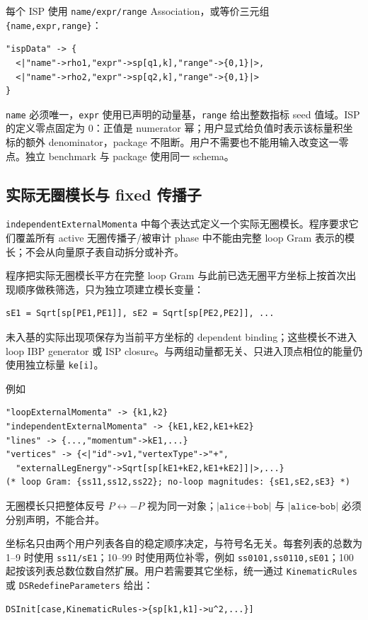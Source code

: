 ﻿\documentclass[a4paper,11pt]{article}
\begin{document}
每个 ISP 使用 \texttt{name/expr/range} Association，或等价三元组 \texttt{\{name,expr,range\}}：
\begin{verbatim}
"ispData" -> {
  <|"name"->rho1,"expr"->sp[q1,k],"range"->{0,1}|>,
  <|"name"->rho2,"expr"->sp[q2,k],"range"->{0,1}|>
}
\end{verbatim}
\texttt{name} 必须唯一，\texttt{expr} 使用已声明的动量基，\texttt{range} 给出整数指标 seed 值域。ISP 的定义零点固定为 $0$：正值是 numerator 幂；用户显式给负值时表示该标量积坐标的额外 denominator，package 不阻断。用户不需要也不能用输入改变这一零点。独立 benchmark 与 package 使用同一 schema。

\subsection{实际无圈模长与 fixed 传播子}

\texttt{independentExternal\allowbreak Momenta} 中每个表达式定义一个实际无圈模长。程序要求它们覆盖所有 active 无圈传播子/被审计 phase 中不能由完整 loop Gram 表示的模长；不会从向量原子表自动拆分或补齐。

程序把实际无圈模长平方在完整 loop Gram 与此前已选无圈平方坐标上按首次出现顺序做秩筛选，只为独立项建立模长变量：
\begin{verbatim}
sE1 = Sqrt[sp[PE1,PE1]], sE2 = Sqrt[sp[PE2,PE2]], ...
\end{verbatim}
未入基的实际出现项保存为当前平方坐标的 dependent binding；这些模长不进入 loop IBP generator 或 ISP closure。与两组动量都无关、只进入顶点相位的能量仍使用独立标量 \texttt{ke[i]}。

例如
\begin{verbatim}
"loopExternalMomenta" -> {k1,k2}
"independentExternalMomenta" -> {kE1,kE2,kE1+kE2}
"lines" -> {...,"momentum"->kE1,...}
"vertices" -> {<|"id"->v1,"vertexType"->"+",
  "externalLegEnergy"->Sqrt[sp[kE1+kE2,kE1+kE2]]|>,...}
(* loop Gram: {ss11,ss12,ss22}; no-loop magnitudes: {sE1,sE2,sE3} *)
\end{verbatim}
无圈模长只把整体反号 $P\leftrightarrow-P$ 视为同一对象；$|\texttt{alice+bob}|$ 与 $|\texttt{alice-bob}|$ 必须分别声明，不能合并。

坐标名只由两个用户列表各自的稳定顺序决定，与符号名无关。每套列表的总数为 1--9 时使用 \texttt{ss11/sE1}；10--99 时使用两位补零，例如 \texttt{ss0101,ss0110,sE01}；100 起按该列表总数位数自然扩展。用户若需要其它坐标，统一通过 \texttt{KinematicRules} 或 \texttt{DSRedefineParameters} 给出：
\begin{verbatim}
DSInit[case,KinematicRules->{sp[k1,k1]->u^2,...}]
\end{verbatim}
\end{document}
